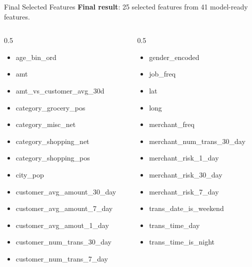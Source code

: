 \documentclass{beamer}
\begin{document}
\begin{frame}{Final Selected Features}
    \textbf{Final result}: 25 selected features from 41 model-ready features.

    \vspace{0.2cm}
    \scriptsize
    \begin{columns}[onlytextwidth]
        \begin{column}{0.5\textwidth}
            \begin{itemize}
                \item age\_bin\_ord
                \item amt
                \item amt\_vs\_customer\_avg\_30d
                \item category\_grocery\_pos
                \item category\_misc\_net
                \item category\_shopping\_net
                \item category\_shopping\_pos
                \item city\_pop
                \item customer\_avg\_amount\_30\_day
                \item customer\_avg\_amount\_7\_day
                \item customer\_avg\_amout\_1\_day
                \item customer\_num\_trans\_30\_day
                \item customer\_num\_trans\_7\_day
            \end{itemize}
        \end{column}
        \begin{column}{0.5\textwidth}
            \begin{itemize}
                \item gender\_encoded
                \item job\_freq
                \item lat
                \item long
                \item merchant\_freq
                \item merchant\_num\_trans\_30\_day
                \item merchant\_risk\_1\_day
                \item merchant\_risk\_30\_day
                \item merchant\_risk\_7\_day
                \item trans\_date\_is\_weekend
                \item trans\_time\_day
                \item trans\_time\_is\_night
            \end{itemize}
        \end{column}
    \end{columns}
\end{frame}
\end{document}
